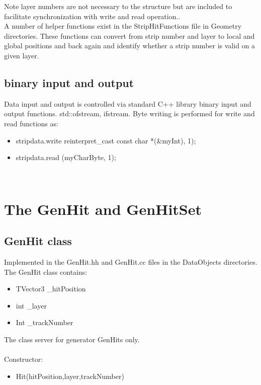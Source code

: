 \documentclass[aps,prd,superscriptaddress,floatfix]{revtex4}
\begin{document}
Note layer numbers are not necessary to the
structure but are included to facilitate synchronization with write and read operation..
\\

A number of helper functions exist in the StripHitFunctions file in Geometry directories.  These functions
can convert from strip number and layer to local and global positions and back again and identify whether a strip number is valid
on a given layer.

\subsection{binary input and output}
Data input and output is controlled via standard C++ library binary input and
output functions. std::ofstream, ifstream.  Byte writing is performed for write and read functions as:

\begin{itemize}
\item stripdata.write reinterpret\_cast const char *(\&myInt), 1);
\item stripdata.read (myCharByte, 1);
\end{itemize}
\

\section{The GenHit and GenHitSet}
\subsection{GenHit class}
Implemented in the GenHit.hh and GenHit.cc files in the DataObjects directories.
\\

The GenHit class contains:\\

\begin{itemize}
\item TVector3 \_hitPosition
\item int \_layer
\item Int \_trackNumber
\end{itemize}


The class server for generator GenHits only.\\
\\  

Constructor:

\begin{itemize}
\item Hit(hitPosition,layer,trackNumber)
\end{itemize}
\end{document}
